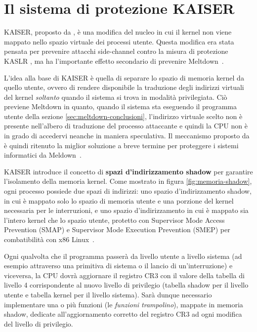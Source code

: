 \section{Il sistema di protezione KAISER}
\label{sec:kaiser}
KAISER, proposto da \textcite{gruss:kaslr}, è una modifica del nucleo in cui il kernel non viene mappato nello spazio virtuale dei processi utente.
Questa modifica era stata pensata per prevenire attacchi side-channel contro la misura di protezione KASLR \cite{hund:practical-timing-side-channel, gruss:prefetch-side-channel-attacks, jang:breaking-kaslr}, ma ha l'importante effetto secondario di prevenire Meltdown~\cite{lipp:meltdown}.

L'idea alla base di KAISER è quella di separare lo spazio di memoria kernel da quello utente, ovvero di rendere disponibile la traduzione degli indirizzi virtuali del kernel \emph{soltanto} quando il sistema si trova in modalità privilegiata.
Ciò previene Meltdown in quanto, quando il sistema sta eseguendo il programma utente della sezione \vref{sec:meltdown-conclusioni}, l'indirizzo virtuale scelto non è presente nell'albero di traduzione del processo attaccante e quindi la CPU non è in grado di accedervi neanche in maniera speculativa.
Il meccanismo proposto da \citeauthor{gruss:kaslr} è quindi ritenuto la miglior soluzione a breve termine per proteggere i sistemi informatici da Meldown~\cite{lipp:meltdown}.

KAISER introduce il concetto di \textbf{spazi d'indirizzamento shadow} per garantire l'isolamento della memoria kernel. 
Come mostrato in figura \vref{fig:memoria-shadow}, ogni processo possiede due spazi di indirizzi: uno spazio d'indirizzamento shadow, in cui è mappato solo lo spazio di memoria utente e una porzione del kernel necessaria per le interruzioni, e uno spazio d'indirizzamento in cui è mappato sia l'intero kernel che lo spazio utente, protetto con Supervisor Mode Access Prevention (SMAP) e Supervisor Mode Execution Prevention (SMEP) per combatibilità con x86 Linux~\cite{gruss:kaslr}.

Ogni qualvolta che il programma passerà da livello utente a livello sistema (ad esempio attraverso una primitiva di sistema o il lancio di un'interruzione) e viceversa, la CPU dovrà aggiornare il registro CR3 con il valore della tabella di livello 4 corrispondente al nuovo livello di privilegio (tabella shadow per il livello utente e tabella kernel per il livello sistema). 
Sarà dunque necessario implementare una o più funzioni (le \emph{funzioni trampolino}), mappate in memoria shadow, dedicate all'aggiornamento corretto del registro CR3 ad ogni modifica del livello di privilegio.

